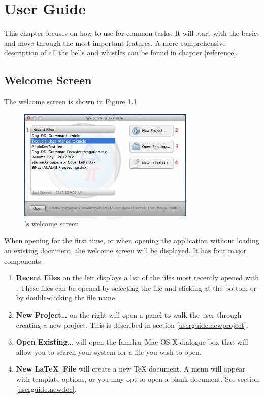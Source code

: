 \chapter{User Guide}
\label{userguide}
This chapter focuses on how to use \texnicle for common tasks. It will start with the basics and move through the most important features. A more comprehensive description of all the bells and whistles can be found in chapter \ref{reference}.

\section{Welcome Screen}
\label{userguide.welcome}
The welcome screen is shown in Figure \ref{fig:texnicle-welcome}.
\begin{figure}[htbp]
\centering
\includegraphics[width=0.75\textwidth]{TeXnicle-Images/texnicle-welcome.jpg}
\caption{\texnicle's welcome screen}
\label{fig:texnicle-welcome}
\end{figure}

When opening \texnicle for the first time, or when opening the application without loading an existing document, the welcome screen will be displayed. It has four major components:
	\begin{enumerate}
		\item \textbf{Recent Files} on the left displays a list of the files most recently opened with \texnicle. These files can be opened by selecting the file and clicking  at the bottom or by double-clicking the file name.
		\item \textbf{New Project\ldots} on the right will open a panel to walk the user through creating a new project. This is described in section \ref{userguide.newproject}.
		\item \textbf{Open Existing\ldots} will open the familiar Mac OS X dialogue box that will allow you to search your system for a file you wish to open.
		\item \textbf{New \LaTeX\ File} will create a new {\TeX} document. A menu will appear with template options, or you may opt to open a blank document. See section \ref{userguide.newdoc}.
	\end{enumerate}
	

